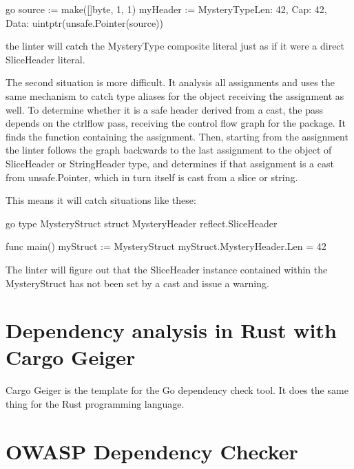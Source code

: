         go
        source := make([]byte, 1, 1)
        myHeader := MysteryTypeLen: 42, Cap: 42, Data: uintptr(unsafe.Pointer(source))


        the linter will catch the MysteryType composite literal just as if it were a direct SliceHeader literal.

        The second situation is more difficult. It analysis all assignments and uses the same mechanism to catch type aliases
        for the object receiving the assignment as well. To determine whether it is a safe header derived from a cast, the pass
        depends on the ctrlflow pass, receiving the control flow graph for the package. It finds the function containing the
        assignment. Then, starting from the assignment the linter follows the graph backwards to the last assignment to the
        object of SliceHeader or StringHeader type, and determines if that assignment is a cast from unsafe.Pointer, which
        in turn itself is cast from a slice or string.

        This means it will catch situations like these:

        go
        type MysteryStruct struct
        MysteryHeader reflect.SliceHeader


        func main()
        myStruct := MysteryStruct
        myStruct.MysteryHeader.Len = 42



        The linter will figure out that the SliceHeader instance contained within the MysteryStruct has not been set by a
        cast and issue a warning.









\section{Dependency analysis in Rust with Cargo Geiger}\label{sec:cargo-geiger}

Cargo Geiger is the template for the Go dependency check tool.
It does the same thing for the Rust programming language.



\section{OWASP Dependency Checker}\label{sec:owasp-dependency-checker}


